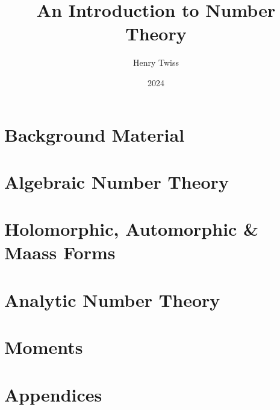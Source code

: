 \documentclass[12pt,oneside]{book}
\title{An Introduction to Number Theory}
\author{Henry Twiss}
\date{2024}
\begin{document}
\maketitle
\pagestyle{empty}
\tableofcontents
\setcounter{page}{0}
\pagestyle{fancy}

\part{Background Material}
  

\part{Algebraic Number Theory}
  
  
  

\part{Holomorphic, Automorphic \& Maass Forms}
  
  
  
  

\part{Analytic Number Theory}
  
  
  

\part{Moments}
  
  

\part{Appendices}
  

\printindex


\end{document}
